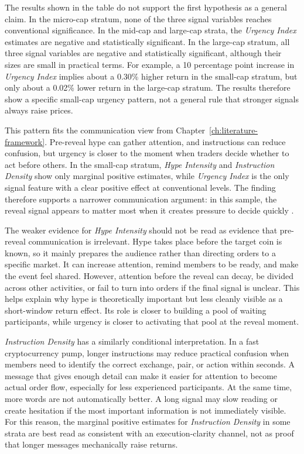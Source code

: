 The results shown in the table do not support the first hypothesis as a general claim. In the micro-cap stratum, none of the three signal variables reaches conventional significance. In the mid-cap and large-cap strata, the \textit{Urgency Index} estimates are negative and statistically significant. In the large-cap stratum, all three signal variables are negative and statistically significant, although their sizes are small in practical terms. For example, a 10 percentage point increase in \textit{Urgency Index} implies about a 0.30\% higher return in the small-cap stratum, but only about a 0.02\% lower return in the large-cap stratum. The results therefore show a specific small-cap urgency pattern, not a general rule that stronger signals always raise prices.

This pattern fits the communication view from Chapter~\ref{ch:literature-framework}. Pre-reveal hype can gather attention, and instructions can reduce confusion, but urgency is closer to the moment when traders decide whether to act before others. In the small-cap stratum, \textit{Hype Intensity} and \textit{Instruction Density} show only marginal positive estimates, while \textit{Urgency Index} is the only signal feature with a clear positive effect at conventional levels. The finding therefore supports a narrower communication argument: in this sample, the reveal signal appears to matter most when it creates pressure to decide quickly \cite{barber2008all, tetlock2007giving, xu2019anatomy, lamorgia2023doge, hamrick2021examination}.

The weaker evidence for \textit{Hype Intensity} should not be read as evidence that pre-reveal communication is irrelevant. Hype takes place before the target coin is known, so it mainly prepares the audience rather than directing orders to a specific market. It can increase attention, remind members to be ready, and make the event feel shared. However, attention before the reveal can decay, be divided across other activities, or fail to turn into orders if the final signal is unclear. This helps explain why hype is theoretically important but less cleanly visible as a short-window return effect. Its role is closer to building a pool of waiting participants, while urgency is closer to activating that pool at the reveal moment.

\textit{Instruction Density} has a similarly conditional interpretation. In a fast cryptocurrency pump, longer instructions may reduce practical confusion when members need to identify the correct exchange, pair, or action within seconds. A message that gives enough detail can make it easier for attention to become actual order flow, especially for less experienced participants. At the same time, more words are not automatically better. A long signal may slow reading or create hesitation if the most important information is not immediately visible. For this reason, the marginal positive estimates for \textit{Instruction Density} in some strata are best read as consistent with an execution-clarity channel, not as proof that longer messages mechanically raise returns.

